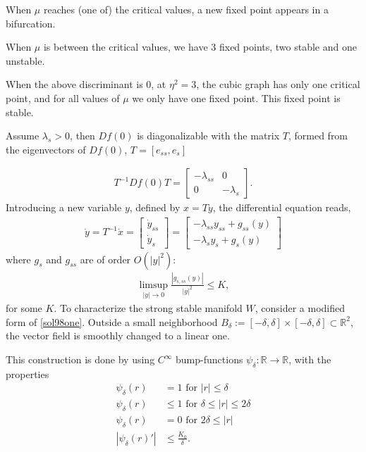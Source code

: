 \begin{solution}[9.7]
When $\mu$ reaches (one of) the critical values, a new fixed point appears in a bifurcation.

When $\mu$ is between the critical values, we have 3 fixed points, two stable and one unstable. 

When the above discriminant is 0, at $\eta^2 = 3$,  the cubic graph has only one critical point, and for all values of $\mu$ we only have one fixed point. This fixed point is stable. 
\end{solution}

\begin{solution}[9.8]
Assume $\lambda_s > 0$, then $Df(0)$ is diagonalizable with the matrix $T$, formed from the eigenvectors of $Df(0)$, $T= [e_{ss}, e_{s}]$

\begin{align}
T^{-1}Df(0)T = \begin{bmatrix}
-\lambda_{ss} & 0 \\
0 & -\lambda_{s}
 \end{bmatrix}.
\end{align}
Introducing a new variable $y$, defined by $x = Ty$, the differential equation reads,
\begin{align}
\dot{y} = T^{-1}\dot{x} = \begin{bmatrix} 
\dot{y}_{ss} \\ 
\dot{y}_{s}\end{bmatrix} = \begin{bmatrix}
-\lambda_{ss} y_{ss} + g_{ss}(y) \\
-\lambda_{s} y_{s} + g_{s}(y)
\end{bmatrix} \label{sol98one}   
\end{align}
where $g_s$ and $g_{ss}$ are of order $O(|y|^2)$:
\begin{align}
    \limsup_{|y|\to 0} \frac{|g_{s,ss}(y)|}{|y|^2}\leq K,
\end{align}
for some $K$. 
To characterize the strong stable manifold $W$, consider a modified form of \eqref{sol98one}. Outside a small neighborhood $B_\delta:=[-\delta, \delta] \times [-\delta, \delta]\subset \mathbb{R}^2$, the vector field is smoothly changed to a linear one. 

This construction is done by using $C^\infty$ bump-functions $\psi_\delta : \mathbb{R} \to \mathbb{R}$, with the properties 
\begin{align}
	\psi_\delta(r) &= 1 \text{ for } |r|\leq \delta \\
\psi_\delta(r) &\leq 1 \text{ for } \delta \leq |r|\leq 2\delta \\
\psi_\delta(r) &= 0 \text{ for } 2\delta \leq |r| \\
|\psi_\delta(r)'| &\leq \frac{K_0}{\delta}.
\end{align}


\end{solution}

